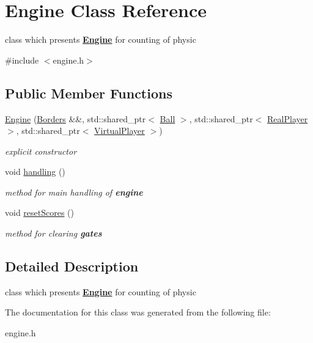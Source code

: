 \hypertarget{class_engine}{}\section{Engine Class Reference}
\label{class_engine}


class which presents {\bfseries{\mbox{\hyperlink{class_engine}{Engine}}}} for counting of physic  




{\ttfamily \#include $<$engine.\+h$>$}

\subsection*{Public Member Functions}
\begin{DoxyCompactItemize}
\item 
\mbox{\label{class_engine_a03ca9c2bb46851dd0ec9704cec977d9f}} 
\mbox{\hyperlink{class_engine_a03ca9c2bb46851dd0ec9704cec977d9f}{Engine}} (\mbox{\hyperlink{class_borders}{Borders}} \&\&, std\+::shared\+\_\+ptr$<$ \mbox{\hyperlink{class_ball}{Ball}} $>$, std\+::shared\+\_\+ptr$<$ \mbox{\hyperlink{class_real_player}{Real\+Player}} $>$, std\+::shared\+\_\+ptr$<$ \mbox{\hyperlink{class_virtual_player}{Virtual\+Player}} $>$)
\begin{DoxyCompactList}\small\item\em explicit {\itshape constructor} \end{DoxyCompactList}\item 
\mbox{\label{class_engine_a3820227ad1195006636cf924a286e479}} 
void \mbox{\hyperlink{class_engine_a3820227ad1195006636cf924a286e479}{handling}} ()
\begin{DoxyCompactList}\small\item\em {\itshape method} for main {\itshape handling} of {\bfseries{engine}} \end{DoxyCompactList}\item 
\mbox{\label{class_engine_aa6ea4e5e0bb455b69c71363f20371197}} 
void \mbox{\hyperlink{class_engine_aa6ea4e5e0bb455b69c71363f20371197}{reset\+Scores}} ()
\begin{DoxyCompactList}\small\item\em {\itshape method} for {\itshape clearing} {\bfseries{gates}} \end{DoxyCompactList}\end{DoxyCompactItemize}


\subsection{Detailed Description}
class which presents {\bfseries{\mbox{\hyperlink{class_engine}{Engine}}}} for counting of physic 

The documentation for this class was generated from the following file\+:\begin{DoxyCompactItemize}
\item 
engine.\+h\end{DoxyCompactItemize}

